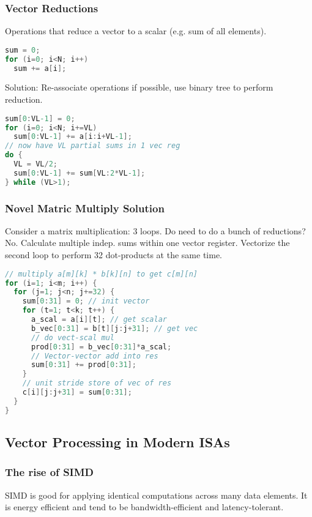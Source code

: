 \documentclass[a4paper, fontsize=8pt, landscape, DIV=1]{scrartcl}
\begin{document}
\begin{multicols*}{4}
  \subsubsection{Vector Reductions}
  Operations that reduce a vector to a scalar (e.g. sum of all elements).
  \begin{lstlisting}[language=C]
sum = 0;
for (i=0; i<N; i++)
  sum += a[i];\end{lstlisting}

  Solution: Re-associate operations if possible, use binary tree to perform reduction.
  \begin{lstlisting}[language=C]
sum[0:VL-1] = 0;
for (i=0; i<N; i+=VL)
  sum[0:VL-1] += a[i:i+VL-1];
// now have VL partial sums in 1 vec reg
do {
  VL = VL/2;
  sum[0:VL-1] += sum[VL:2*VL-1];
} while (VL>1);\end{lstlisting}

  \subsubsection{Novel Matric Multiply Solution}
  Consider a matrix multiplication: 3 loops. Do need to do a bunch of reductions?
  No. Calculate multiple indep. sums within one vector register. Vectorize
  the second loop to perform 32 dot-products at the same time.
  \begin{lstlisting}[language=C]
// multiply a[m][k] * b[k][n] to get c[m][n]
for (i=1; i<m; i++) {
  for (j=1; j<n; j+=32) {
    sum[0:31] = 0; // init vector
    for (t=1; t<k; t++) {
      a_scal = a[i][t]; // get scalar
      b_vec[0:31] = b[t][j:j+31]; // get vec
      // do vect-scal mul
      prod[0:31] = b_vec[0:31]*a_scal;
      // Vector-vector add into res
      sum[0:31] += prod[0:31];
    }
    // unit stride store of vec of res
    c[i][j:j+31] = sum[0:31];
  }
}\end{lstlisting}

  \subsection{Vector Processing in Modern ISAs}
  \subsubsection{The rise of SIMD}
  SIMD is good for applying identical computations across many data elements. It is
  energy efficient and tend to be bandwidth-efficient and latency-tolerant.


\end{multicols*}
\end{document}
